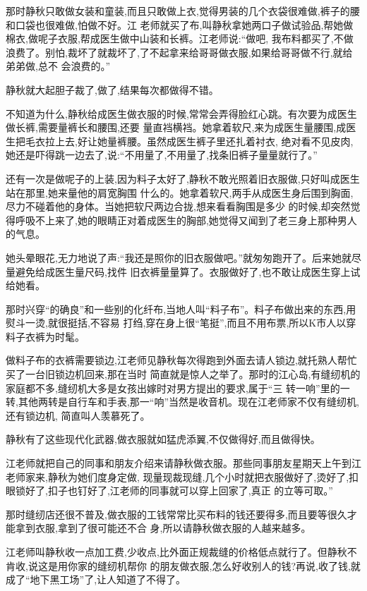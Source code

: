 ﻿\documentclass[12pt]{article}
\begin{document}
那时静秋只敢做女装和童装,而且只敢做上衣,觉得男装的几个衣袋很难做,裤子的腰和口袋也很难做,怕做不好。江
老师就买了布,叫静秋拿她两口子做试验品,帮她做棉衣,做呢子衣服,帮成医生做中山装和长裤。江老师说:``做吧,
我布料都买了,不做浪费了。别怕,裁坏了就裁坏了,了不起拿来给哥哥做衣服,如果给哥哥做不行,就给弟弟做,总不
会浪费的。''

静秋就大起胆子裁了,做了,结果每次都做得不错。

不知道为什么,静秋给成医生做衣服的时候,常常会弄得脸红心跳。有次要为成医生做长裤,需要量裤长和腰围,还要
量直裆横裆。她拿着软尺,来为成医生量腰围,成医生把毛衣拉上去,好让她量裤腰。虽然成医生裤子里还扎着衬衣,
绝对看不见皮肉,她还是吓得跳一边去了,说:``不用量了,不用量了,找条旧裤子量量就行了。''

还有一次是做呢子的上装,因为料子太好了,静秋不敢光照着旧衣服做,只好叫成医生站在那里,她来量他的肩宽胸围
什么的。她拿着软尺,两手从成医生身后围到胸面,尽力不碰着他的身体。当她把软尺两边合拢,想来看看胸围是多少
的时候,却突然觉得呼吸不上来了,她的眼睛正对着成医生的胸部,她觉得又闻到了老三身上那种男人的气息。

她头晕眼花,无力地说了声:``我还是照你的旧衣服做吧。''就匆匆跑开了。后来她就尽量避免给成医生量尺码,找件
旧衣裤量量算了。衣服做好了,也不敢让成医生穿上试给她看。

那时兴穿``的确良''和一些别的化纤布,当地人叫``料子布''。料子布做出来的东西,用熨斗一烫,就很挺括,不容易
打绉,穿在身上很``笔挺'',而且不用布票,所以K市人以穿料子衣裤为时髦。

做料子布的衣裤需要锁边,江老师见静秋每次得跑到外面去请人锁边,就托熟人帮忙买了一台旧锁边机回来,那在当时
简直就是惊人之举了。那时的江心岛,有缝纫机的家庭都不多,缝纫机大多是女孩出嫁时对男方提出的要求,属于``三
转一响''里的一转,其他两转是自行车和手表,那一``响''当然是收音机。现在江老师家不仅有缝纫机,还有锁边机,
简直叫人羡慕死了。

静秋有了这些现代化武器,做衣服就如猛虎添翼,不仅做得好,而且做得快。

江老师就把自己的同事和朋友介绍来请静秋做衣服。那些同事朋友星期天上午到江老师家来,静秋为她们度身定做,
现量现裁现缝,几个小时就把衣服做好了,烫好了,扣眼锁好了,扣子也钉好了,江老师的同事就可以穿上回家了,真正
的立等可取。''

那时缝纫店还很不普及,做衣服的工钱常常比买布料的钱还要得多,而且要等很久才能拿到衣服,拿到了很可能还不合
身,所以请静秋做衣服的人越来越多。

江老师叫静秋收一点加工费,少收点,比外面正规裁缝的价格低点就行了。但静秋不肯收,说这是用你家的缝纫机帮你
的朋友做衣服,怎么好收别人的钱?再说,收了钱,就成了``地下黑工场''了,让人知道了不得了。
\end{document}
